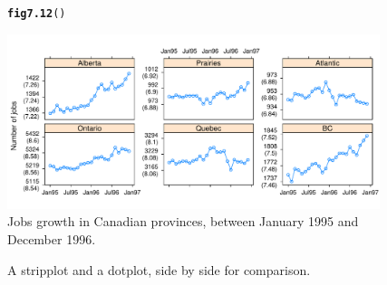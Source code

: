 \documentclass[12pt, a4paper,  BCOR=8.25mm, DIV=15]{scrartcl}\usepackage[]{graphicx}\usepackage[]{color}
\makeatletter
\newcommand{\hlstd}[1]{\textcolor[rgb]{0.345,0.345,0.345}{#1}}%
\newcommand{\hlkwd}[1]{\textcolor[rgb]{0.737,0.353,0.396}{\textbf{#1}}}%
\newenvironment{kframe}{%
 \def\at@end@of@kframe{}%
 \ifinner\ifhmode%
  \def\at@end@of@kframe{\end{minipage}}%
  \begin{minipage}{\columnwidth}%
 \fi\fi%
 \def\FrameCommand##1{\hskip\@totalleftmargin \hskip-\fboxsep
 \colorbox{shadecolor}{##1}\hskip-\fboxsep
     \hskip-\linewidth \hskip-\@totalleftmargin \hskip\columnwidth}%
 \MakeFramed {\advance\hsize-\width
   \@totalleftmargin\z@ \linewidth\hsize
   \@setminipage}}%
 {\par\unskip\endMakeFramed%
 \at@end@of@kframe}
\newenvironment{knitrout}{}{} %
\makeatother
\begin{document}
\begin{figure}[ht]
\begin{knitrout}
\color{fgcolor}\begin{kframe}
\begin{alltt}
\hlkwd{fig7.12}\hlstd{()}
\end{alltt}
\end{kframe}

{\centering \includegraphics[width=0.97\textwidth]{figure/gph-fig7_12e-1} 

}



\end{knitrout}
\caption{Jobs growth in Canadian provinces, between January 1995
  and December 1996.}\label{fig:jobsplot}
\end{figure}

\begin{figure}[ht]

\caption{A stripplot and a dotplot, side by side for comparison.}
\end{figure}
\end{document}
